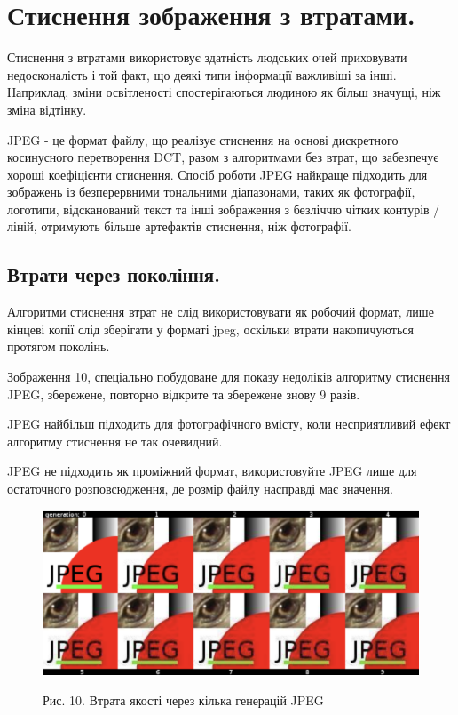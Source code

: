 \documentclass[11pt]{article}
\begin{document}
    \section{Стиснення зображення з втратами.}\label{sec:lossy_image_compression}
    Стиснення з втратами використовує здатність людських очей приховувати недосконалість і той факт, що деякі типи інформації важливіші за інші.
    Наприклад, зміни освітленості спостерігаються людиною як більш значущі, ніж зміна відтінку.

    JPEG - це формат файлу, що реалізує стиснення на основі дискретного косинусного перетворення DCT, разом з алгоритмами без втрат, що забезпечує хороші коефіцієнти стиснення.
    Спосіб роботи JPEG найкраще підходить для зображень із безперервними тональними діапазонами, таких як фотографії, логотипи, відсканований текст та інші зображення з безліччю чітких контурів / ліній, отримують більше артефактів стиснення, ніж фотографії.

    \subsection{Втрати через покоління.}\label{sec:loss_through_generations}
    Алгоритми стиснення втрат не слід використовувати як робочий формат, лише кінцеві копії слід зберігати у форматі jpeg, оскільки втрати накопичуються протягом поколінь.

    Зображення 10, спеціально побудоване для показу недоліків алгоритму стиснення JPEG, збережене, повторно відкрите та збережене знову 9 разів.

    JPEG найбільш підходить для фотографічного вмісту, коли несприятливий ефект алгоритму стиснення не так очевидний.

    JPEG не підходить як проміжний формат, використовуйте JPEG лише для остаточного розповсюдження, де розмір файлу насправді має значення.

    \begin{figure}
        \label{fig:image10}
        \centering
        \includegraphics[scale=0.5]{image10.png}

        Рис. 10. Втрата якості через кілька генерацій JPEG
    \end{figure}
\end{document}
